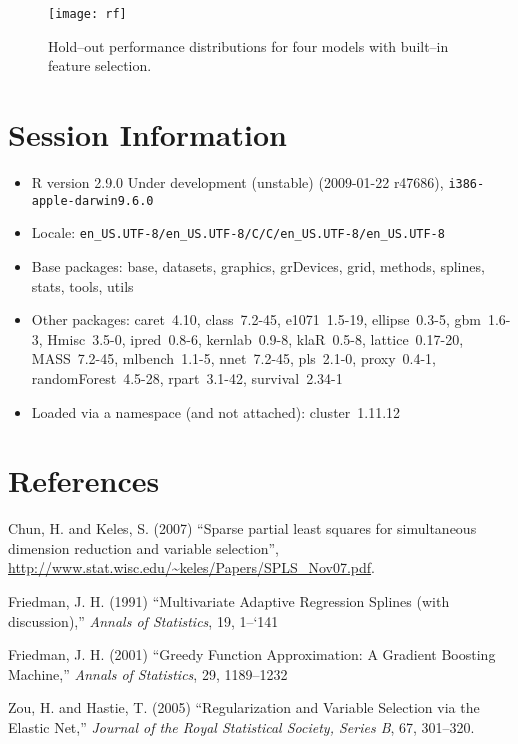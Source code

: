 \documentclass[12pt]{article}
\begin{document}
\begin{figure}
   \begin{center}		
      \texttt{[image: rf]}
      \caption{Hold--out performance distributions for four models with built--in feature selection.}
      \label{F:rf} 
    \end{center}
\end{figure}

\section{Session Information}

\begin{itemize}
  \item R version 2.9.0 Under development (unstable) (2009-01-22 r47686), \verb|i386-apple-darwin9.6.0|
  \item Locale: \verb|en_US.UTF-8/en_US.UTF-8/C/C/en_US.UTF-8/en_US.UTF-8|
  \item Base packages: base, datasets, graphics, grDevices, grid,
    methods, splines, stats, tools, utils
  \item Other packages: caret~4.10, class~7.2-45, e1071~1.5-19,
    ellipse~0.3-5, gbm~1.6-3, Hmisc~3.5-0, ipred~0.8-6, kernlab~0.9-8,
    klaR~0.5-8, lattice~0.17-20, MASS~7.2-45, mlbench~1.1-5,
    nnet~7.2-45, pls~2.1-0, proxy~0.4-1, randomForest~4.5-28,
    rpart~3.1-42, survival~2.34-1
  \item Loaded via a namespace (and not attached): cluster~1.11.12
\end{itemize}
\section{References}

\begin{description}
  \item Chun, H. and Keles, S. (2007) ``Sparse partial least squares for simultaneous dimension reduction and variable selection'', \url{http://www.stat.wisc.edu/~keles/Papers/SPLS_Nov07.pdf}.
    
  \item Friedman, J. H. (1991) ``Multivariate Adaptive Regression Splines (with discussion),'' {\it Annals of Statistics}, 19, 1--`141
    \item  Friedman, J. H. (2001) ``Greedy Function Approximation: A Gradient Boosting Machine,'' {\it Annals of Statistics},  29, 1189--1232
  \item Zou, H. and Hastie, T.  (2005) ``Regularization and Variable Selection via the Elastic Net,'' {\it Journal of the Royal Statistical Society, Series B}, 67, 301--320.
    
  \end{description}
\end{document}
